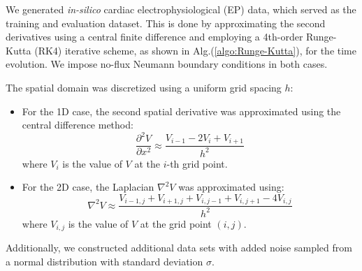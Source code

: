 We generated \textit{in-silico} cardiac electrophysiological (EP) data, which served as the training and evaluation dataset. This is done by approximating the second derivatives using a central finite difference and employing a 4th-order Runge-Kutta (RK4) iterative scheme, as shown in Alg.(\ref{algo:Runge-Kutta}), for the time evolution. We impose no-flux Neumann boundary conditions in both cases.



The spatial domain was discretized using a uniform grid spacing $h$:
\begin{itemize}
  \item For the 1D case, the second spatial derivative was approximated using the central difference method:
  \begin{equation}
  \frac{\partial^2 V}{\partial x^2} \approx \frac{V_{i-1} - 2V_i + V_{i+1}}{h^2}
  \end{equation}
  where $V_i$ is the value of $V$ at the $i$-th grid point.
  \item For the 2D case, the Laplacian $\nabla^2 V$ was approximated using:
  \begin{equation}
  \nabla^2 V \approx \frac{V_{i-1,j} + V_{i+1,j} + V_{i,j-1} + V_{i,j+1} - 4V_{i,j}}{h^2}
  \end{equation}
  where $V_{i,j}$ is the value of $V$ at the grid point $(i,j)$.
\end{itemize}

Additionally, we constructed additional data sets with added noise sampled from a normal distribution with standard deviation $\sigma$.

